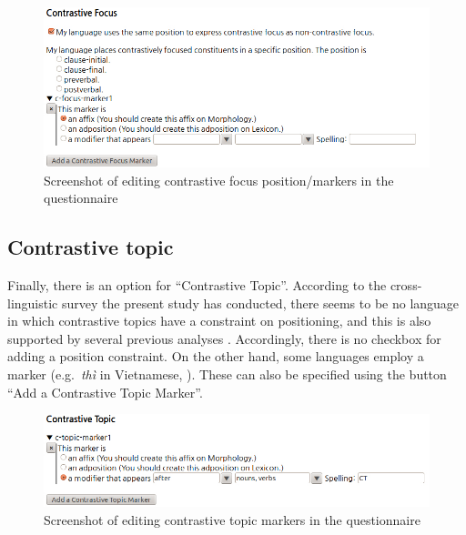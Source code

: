 \begin{figure}[!t]
\begin{center} 
\includegraphics[width=.9\textwidth]{screenshot/cf.jpg}
\caption{Screenshot of editing contrastive focus position/markers in the questionnaire}
\label{screenshot:cf}
\end{center}
\end{figure}


\subsection{Contrastive topic}
\label{11:ssec:questionnaire-ct}

Finally, there is an option for ``Contrastive Topic''. According to the cross-linguistic survey the present study
has conducted, there seems to be no language in which contrastive
topics have a constraint on positioning, and this is also supported by
several previous analyses
\citep{choi:99,erteschik:07,bianchi:frascarelli:10}. Accordingly,
there is no checkbox for adding a position constraint. On the other
hand, some languages employ a  marker
(e.g.\ \textit{th{\`i}} in Vietnamese, \citealt{nguyen:06}). These can
also be specified using the button ``Add a Contrastive Topic Marker''.

\begin{figure}[!t]
\begin{center} 
\includegraphics[width=.9\textwidth]{screenshot/ct.jpg}
\caption{Screenshot of editing contrastive topic markers in the questionnaire}
\label{screenshot:ct}
\end{center}
\end{figure}




